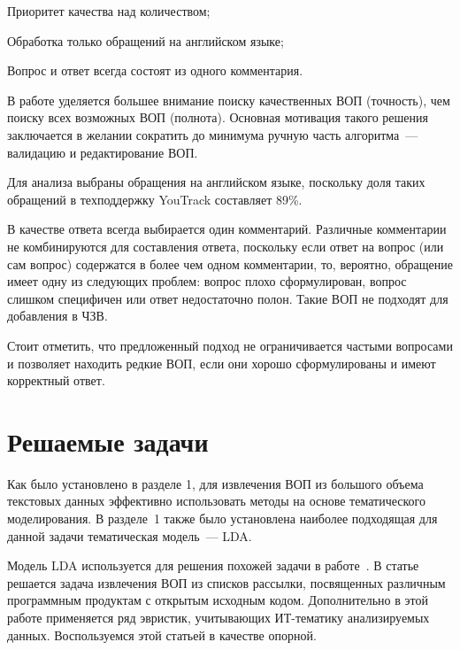 \begin{itemize*}
\item Приоритет качества над количеством;
\item Обработка только обращений на английском языке;
\item Вопрос и ответ всегда состоят из одного комментария.
\end{itemize*}

В работе уделяется большее внимание поиску качественных ВОП (точность), чем поиску всех возможных ВОП (полнота). Основная мотивация такого решения заключается в желании сократить до минимума ручную часть алгоритма~--- валидацию и редактирование ВОП.

Для анализа выбраны обращения на английском языке, поскольку доля таких обращений в техподдержку YouTrack составляет 89\%. 

В качестве ответа всегда выбирается один комментарий. Различные комментарии не комбинируются для составления ответа, поскольку если ответ на вопрос (или сам вопрос) содержатся в более чем одном комментарии, то, вероятно, обращение имеет одну из следующих проблем: вопрос плохо сформулирован, вопрос слишком специфичен или ответ недостаточно полон. Такие ВОП не подходят для добавления в ЧЗВ.

Стоит отметить, что предложенный подход не ограничивается частыми вопросами и позволяет находить редкие ВОП, если они хорошо сформулированы и имеют корректный ответ.

\section{Решаемые задачи}
\label{sec:tasks}

Как было установлено в разделе 1, для извлечения ВОП из большого объема текстовых данных эффективно использовать методы на основе тематического моделирования. В разделе~1 также было установлена наиболее подходящая для данной задачи тематическая модель~--- LDA.

Модель LDA используется для решения похожей задачи в работе~\cite{original}. В статье~\cite{original} решается задача извлечения ВОП из списков рассылки, посвященных различным программным продуктам с открытым исходным кодом. Дополнительно в этой работе применяется ряд эвристик, учитывающих ИТ-тематику анализируемых данных. Воспользуемся этой статьей в качестве опорной.

